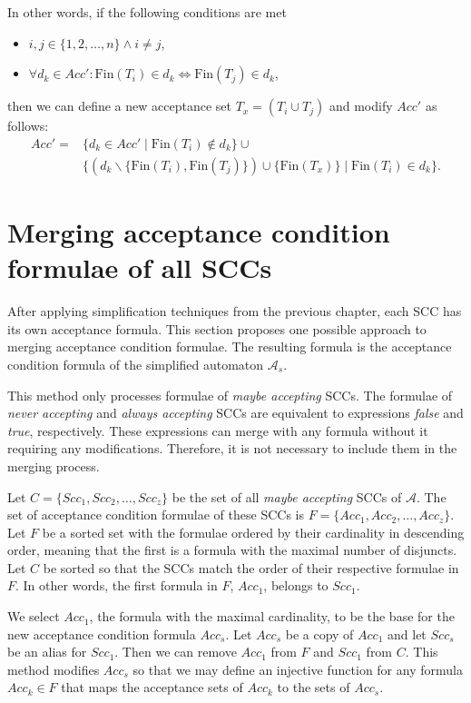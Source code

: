 \documentclass[
  digital, %
  twoside, %
  table,   %
  lof,     %
  lot,     %
]{fithesis3}
\begin{document}
In other words, if the following conditions are met
\begin{itemize}
  \item $i, j \in \{1, 2, \dots, n\} \wedge i \neq j$,
  \item $\forall d_k \in Acc' \colon \text{Fin}(T_i) \in d_k \Leftrightarrow \text{Fin}(T_j) \in d_k$,
\end{itemize}
then we can define a new acceptance set $T_x = (T_i \cup T_j)$ and modify $Acc'$ as follows: 
\begin{align*}
  Acc' =& \{d_k \in Acc' \mid \text{Fin}(T_i) \notin d_k\} \cup \\ &\{(d_k \smallsetminus \{\text{Fin}(T_i), \text{Fin}(T_j)\}) \cup \{\text{Fin}(T_x)\} \mid \text{Fin}(T_i) \in d_k\}.
\end{align*}

\section{Merging acceptance condition formulae of all SCCs}
\label{sec:merging_formulae}
After applying simplification techniques from the previous chapter, each SCC has its own acceptance formula. This section proposes one possible approach to merging acceptance condition formulae. The resulting formula is the acceptance condition formula of the simplified automaton $\mathcal{A}_s$.

This method only processes formulae of \emph{maybe accepting} SCCs. The formulae of \emph{never accepting} and \emph{always accepting} SCCs are equivalent to expressions \emph{false} and \emph{true}, respectively. These expressions can merge with any formula without it requiring any modifications. Therefore, it is not necessary to include them in the merging process. 

Let $C = \{Scc_1, Scc_2, \dots, Scc_z\}$ be the set of all \emph{maybe accepting} SCCs of $\mathcal{A}$. The set of acceptance condition formulae of these SCCs is $F = \{Acc_1, Acc_2, \dots, Acc_z\}$. Let $F$ be a sorted set with the formulae ordered by their cardinality in descending order, meaning that the first is a formula with the maximal number of disjuncts. Let $C$ be sorted so that the SCCs match the order of their respective formulae in $F$. In other words, the first formula in $F$, $Acc_1$, belongs to $Scc_1$.

We select $Acc_1$, the formula with the maximal cardinality, to be the base for the new acceptance condition formula $Acc_s$. Let $Acc_s$ be a copy of $Acc_1$ and let $Scc_s$ be an alias for $Scc_1$. Then we can remove $Acc_1$ from $F$ and $Scc_1$ from $C$. This method modifies $Acc_s$ so that we may define an injective function for any formula $Acc_k \in F$ that maps the acceptance sets of $Acc_k$ to the sets of $Acc_s$. 
\end{document}
